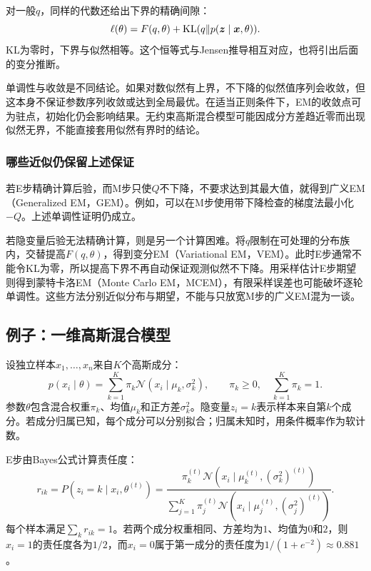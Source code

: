 对一般$q$，同样的代数还给出下界的精确间隙：
\begin{equation}
 \ell(\theta)=F(q,\theta)+\operatorname{KL}(q\|p(\bm z\mid\bm x,\theta)).
 \label{eq:solving-em-decomposition}
\end{equation}
KL为零时，下界与似然相等。这个恒等式与Jensen推导相互对应，也将引出后面的变分推断。

单调性与收敛是不同结论。如果对数似然有上界，不下降的似然值序列会收敛，但这本身不保证参数序列收敛或达到全局最优。在适当正则条件下，EM的收敛点可为驻点，初始化仍会影响结果。无约束高斯混合模型可能因成分方差趋近零而出现似然无界，不能直接套用似然有界时的结论。

\subsubsection{哪些近似仍保留上述保证}
若E步精确计算后验，而M步只使$Q$不下降，不要求达到其最大值，就得到广义EM（Generalized EM，GEM）。例如，可以在M步使用带下降检查的梯度法最小化$-Q$。上述单调性证明仍成立。

若隐变量后验无法精确计算，则是另一个计算困难。将$q$限制在可处理的分布族内，交替提高$F(q,\theta)$，得到变分EM（Variational EM，VEM）。此时E步通常不能令KL为零，所以提高下界不再自动保证观测似然不下降。用采样估计E步期望则得到蒙特卡洛EM（Monte Carlo EM，MCEM），有限采样误差也可能破坏逐轮单调性。这些方法分别近似分布与期望，不能与只放宽M步的广义EM混为一谈。

\subsection{例子：一维高斯混合模型}
设独立样本$x_1,\ldots,x_n$来自$K$个高斯成分：
\begin{equation}
 p(x_i\mid\theta)=\sum_{k=1}^K\pi_k\mathcal N(x_i\mid\mu_k,\sigma_k^2),
 \qquad \pi_k\geq0,\quad \sum_{k=1}^K\pi_k=1.
\end{equation}
参数$\theta$包含混合权重$\pi_k$、均值$\mu_k$和正方差$\sigma_k^2$。隐变量$z_i=k$表示样本来自第$k$个成分。若成分归属已知，每个成分可以分别拟合；归属未知时，用条件概率作为软计数。

E步由Bayes公式计算责任度：
\begin{equation}
 r_{ik}=P(z_i=k\mid x_i,\theta^{(t)})
 =\frac{\pi_k^{(t)}\mathcal N(x_i\mid\mu_k^{(t)},(\sigma_k^2)^{(t)})}
 {\sum_{j=1}^K\pi_j^{(t)}\mathcal N(x_i\mid\mu_j^{(t)},(\sigma_j^2)^{(t)})}.
\end{equation}
每个样本满足$\sum_k r_{ik}=1$。若两个成分权重相同、方差均为$1$、均值为$0$和$2$，则$x_i=1$的责任度各为$1/2$，而$x_i=0$属于第一成分的责任度为$1/(1+e^{-2})\approx0.881$。

